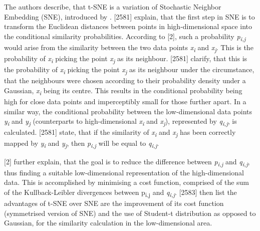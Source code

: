 The authors describe, that t-SNE is a variation of Stochastic Neighbor Embedding (SNE), introduced by \textcite{hinton2003stochastic}. \textcite{maaten2008visualizing}[2581] explain, that the first step in SNE is to transform the Euclidean distances between points in high-dimensional space into the conditional similarity probabilities. According to \textcite{hinton2003stochastic}[2], such a probability \textit{p\textsubscript{i,j}} would arise from the similarity between the two data points \textit{x\textsubscript{i}} and \textit{x\textsubscript{j}}. This is the probability of \textit{x\textsubscript{i}} picking the point \textit{x\textsubscript{j}} as its neighbour. \textcite{maaten2008visualizing}[2581] clarify, that this is the probability of \textit{x\textsubscript{i}} picking the point \textit{x\textsubscript{j}} as its neighbour under the circumstance, that the neighbours were chosen according to their probability density under a Gaussian, \textit{x\textsubscript{i}} being its centre. This results in the conditional probability being high for close data points and imperceptibly small for those further apart.
In a similar way, the conditional probability between the low-dimensional data points \textit{y\textsubscript{i}} and \textit{y\textsubscript{j}} (counterparts to high-dimensional \textit{x\textsubscript{i}} and \textit{x\textsubscript{j}}), represented by \textit{q\textsubscript{i,j}}, is calculated. 
\textcite{maaten2008visualizing}[2581] state, that if the similarity of \textit{x\textsubscript{i}} and \textit{x\textsubscript{j}} has been correctly mapped by \textit{y\textsubscript{i}} and \textit{y\textsubscript{j}}, then \textit{p\textsubscript{i,j}} will be equal to \textit{q\textsubscript{i,j}}. 


\textcite{hinton2003stochastic}[2] further explain, that the goal is to reduce the difference between \textit{p\textsubscript{i,j}} and \textit{q\textsubscript{i,j}}, thus finding a suitable low-dimensional representation of the high-dimensional data. This is accomplished by minimising a cost function, comprised of the sum of the Kullback-Leibler divergences between {p\textsubscript{i,j}} and \textit{q\textsubscript{i,j}}. 
\textcite{maaten2008visualizing}[2583] then list the advantages of t-SNE over SNE are the improvement of its cost function (symmetrised version of SNE) and the use of Student-t distribution as opposed to Gaussian, for the similarity calculation in the low-dimensional area.

